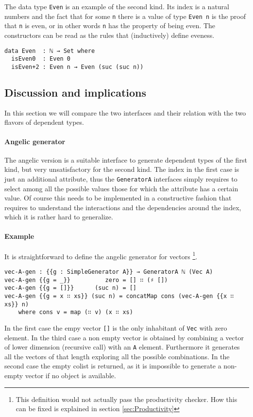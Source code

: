 \documentclass[10pt,a4paper]{article}
\begin{document}
The data type \texttt{Even} is an example of the second kind.
Its index is a natural numbers and the fact that for some \texttt{n} there is a value of type \texttt{Even n} is the proof that \texttt{n} is even, or in other words \texttt{n} has the property of being even.
The constructors can be read as the rules that (inductively) define eveness.
\begin{verbatim}
data Even  : ℕ → Set where
  isEven0  : Even 0
  isEven+2 : Even n → Even (suc (suc n))
\end{verbatim}

\subsection{Discussion and implications}
In this section we will compare the two interfaces and their relation with the two flavors of dependent types.

\paragraph{Angelic generator}
The angelic version is a suitable interface to generate dependent types of the first kind, but very unsatisfactory for the second kind.
The index in the first case is just an additional attribute, thus the \texttt{GeneratorA} interfaces simply requires to select among all the possible values those for which the attribute has a certain value. Of course this needs to be implemented in a constructive fashion that requires to understand the interactions and the dependencies around the index, which it is rather hard to generalize. 

\paragraph{Example}
It is straightforward to define the angelic generator for vectors \footnote{This definition would not actually pass the productivity checker. How this can be fixed is explained in section \ref{sec:Productivity}}.
\begin{verbatim}
vec-A-gen : {{g : SimpleGenerator A}} → GeneratorA ℕ (Vec A)
vec-A-gen {{g = _}}          zero = [] ∷ (♯ [])
vec-A-gen {{g = []}}      (suc n) = []
vec-A-gen {{g = x ∷ xs}} (suc n) = concatMap cons (vec-A-gen {{x ∷ xs}} n)
    where cons v = map (∷ v) (x ∷ xs)
\end{verbatim}
In the first case the empy vector \texttt{[]} is the only inhabitant of \texttt{Vec} with zero element. In the third case a non empty vector is obtained by combining a vector of lower dimension (recursive call) with an \texttt{A} element. Furthermore it generates all the vectors of that length exploring all the possible combinations. In the second case the empty colist is returned, as it is impossible to generate a non-empty vector if no object is available.
\end{document}
